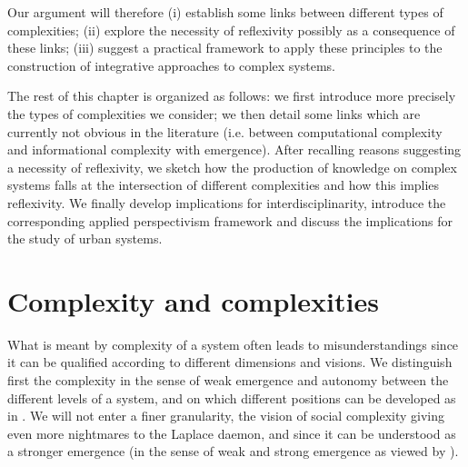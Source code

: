 Our argument will therefore (i) establish some links between different types of complexities; (ii) explore the necessity of reflexivity possibly as a consequence of these links; (iii) suggest a practical framework to apply these principles to the construction of integrative approaches to complex systems. 

The rest of this chapter is organized as follows: we first introduce more precisely the types of complexities we consider; we then detail some links which are currently not obvious in the literature (i.e. between computational complexity and informational complexity with emergence). After recalling reasons suggesting a necessity of reflexivity, we sketch how the production of knowledge on complex systems falls at the intersection of different complexities and how this implies reflexivity. We finally develop implications for interdisciplinarity, introduce the corresponding applied perspectivism framework and discuss the implications for the study of urban systems.



\section{Complexity and complexities}


What is meant by complexity of a system often leads to misunderstandings since it can be qualified according to different dimensions and visions. We distinguish first the complexity in the sense of weak emergence and autonomy between the different levels of a system, and on which different positions can be developed as in \cite{deffuant2015visions}. We will not enter a finer granularity, the vision of social complexity giving even more nightmares to the Laplace daemon, and since it can be understood as a stronger emergence (in the sense of weak and strong emergence as viewed by \cite{bedau2002downward}).


